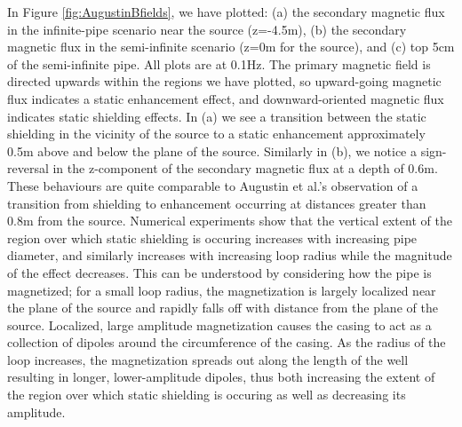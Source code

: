 In Figure \ref{fig:AugustinBfields}, we have plotted: (a) the secondary magnetic flux in the infinite-pipe scenario near the source (z=-4.5m), (b) the secondary magnetic flux in the semi-infinite scenario (z=0m for the source), and (c) top 5cm of the semi-infinite pipe. All plots are at 0.1Hz. The primary magnetic field is directed upwards within the regions we have plotted, so upward-going magnetic flux indicates a static enhancement effect, and downward-oriented magnetic flux indicates static shielding effects. In (a) we see a transition between the static shielding in the vicinity of the source to a static enhancement approximately 0.5m above and below the plane of the source. Similarly in (b), we notice a sign-reversal in the z-component of the secondary magnetic flux at a depth of 0.6m. These behaviours are quite comparable to Augustin et al.'s observation of a transition from shielding to enhancement occurring at distances greater than 0.8m from the source. Numerical experiments show that the vertical extent of the region over which static shielding is occuring increases with increasing pipe diameter, and similarly increases with increasing loop radius while the magnitude of the effect decreases. This can be understood by considering how the pipe is magnetized; for a small loop radius, the magnetization is largely localized near the plane of the source and rapidly falls off with distance from the plane of the source. Localized, large amplitude magnetization causes the casing to act as a collection of dipoles around the circumference of the casing. As the radius of the loop increases, the magnetization spreads out along the length of the well resulting in longer, lower-amplitude dipoles, thus both increasing the extent of the region over which static shielding is occuring as well as decreasing its amplitude.




